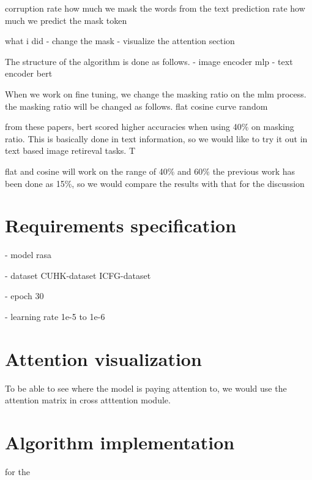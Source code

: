 corruption rate how much we mask the words from the text
prediction rate how much we predict the mask token 




what i did 
- change the mask 
- visualize the attention section

The structure of the algorithm is done as follows. 
- image encoder
  mlp 
- text encoder
  bert 

When we work on fine tuning, we change the masking ratio on the mlm process. 
the masking ratio will be changed as follows.
flat 
cosine curve 
random 

from these papers, bert scored higher accuracies when using 40\% on masking ratio. This is basically done in text information, 
so we would like to try it out in text based image retireval tasks. T

flat and cosine will work on the range of 40\% and 60\% 
the previous work has been done as 15\%, so we would compare the results with that for the discussion 

\section{Requirements specification}

- model
rasa

- dataset 
CUHK-dataset
ICFG-dataset

- epoch
30

- learning rate 
1e-5 to 1e-6

\section{Attention visualization}
To be able to see where the model is paying attention to, we would use the attention matrix in cross atttention module.



\section{Algorithm implementation}

for the 